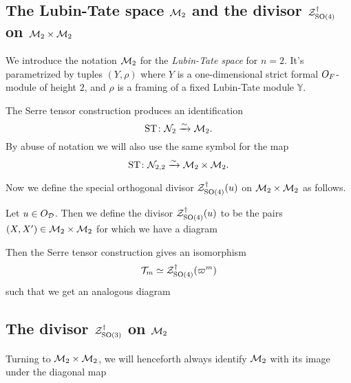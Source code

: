 \subsection{The Lubin-Tate space $\mathcal M_2$ and the divisor $\mathcal Z^{\dagger}_{\operatorname{SO}(4)}$ on $\mathcal M_2 \times \mathcal M_2$}
We introduce the notation $\mathcal M_2$ for the \emph{Lubin-Tate space} for $n = 2$.
It's parametrized by tuples $(Y, \rho)$
where $Y$ is a one-dimensional strict formal $O_F$-module of height $2$,
and $\rho$ is a framing of a fixed Lubin-Tate module $\mathbb{Y}$.

\begin{proposition}
  The Serre tensor construction produces an identification
  \[ \operatorname{ST} \colon \mathcal N_2 \xrightarrow{\sim} \mathcal M_2. \]
  By abuse of notation we will also use the same symbol for the map
  \[ \operatorname{ST} \colon \mathcal N_{2,2} \xrightarrow{\sim} \mathcal M_2 \times \mathcal M_2. \]
\end{proposition}

Now we define the special orthogonal divisor $\mathcal Z^{\dagger}_{\operatorname{SO}(4)}(u)$
on $\mathcal M_2 \times \mathcal M_2$ as follows.
\begin{definition}
  Let $u \in O_\mathcal D$.
  Then we define the divisor $\mathcal Z^{\dagger}_{\operatorname{SO}(4)}(u)$ to be
  the pairs $(X, X') \in \mathcal M_2 \times \mathcal M_2$
  for which we have a diagram
  \begin{center}
  \end{center}
\end{definition}
Then the Serre tensor construction gives an isomorphism
\[ \mathcal{T}_m \simeq \mathcal Z^{\dagger}_{\operatorname{SO}(4)}(\varpi^m) \]
such that we get an analogous diagram
\begin{center}
\end{center}

\subsection{The divisor $\mathcal Z^{\dagger}_{\operatorname{SO}(3)}$ on $\mathcal M_2$}
Turning to $\mathcal M_2 \times \mathcal M_2$, we will henceforth always identify $\mathcal M_2$
with its image under the diagonal map
\begin{center}
\end{center}

